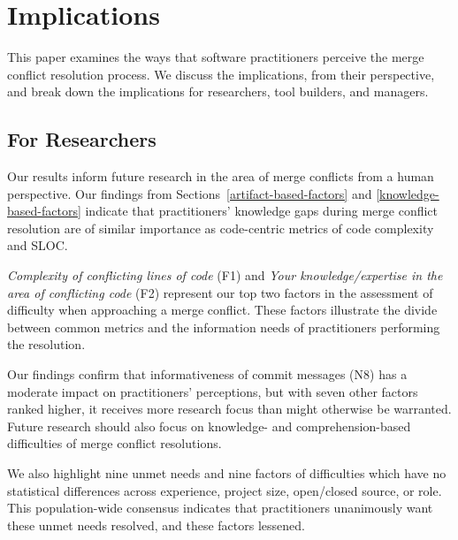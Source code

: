 \section{Implications}\label{implications}
This paper examines the ways that software practitioners perceive the merge conflict resolution process.
We discuss the implications, from their perspective, and break down the implications for researchers, tool builders, and managers.

\subsection{For Researchers}
Our results inform future research in the area of merge conflicts from a human perspective.
Our findings from Sections~\ref{artifact-based-factors} and \ref{knowledge-based-factors} indicate that practitioners' knowledge gaps during merge conflict resolution are of similar importance as code-centric metrics of code complexity and SLOC.

\textit{Complexity of conflicting lines of code} (F1) and \textit{Your knowledge/expertise in the area of conflicting code} (F2) represent our top two factors in the assessment of difficulty when approaching a merge conflict.
These factors illustrate the divide between common metrics and the information needs of practitioners performing the resolution.
 
Our findings confirm that informativeness of commit messages (N8) has a moderate impact on practitioners' perceptions, but with seven other factors ranked higher, it receives more research focus than might otherwise be warranted.
Future research should also focus on knowledge- and comprehension-based difficulties of  merge conflict resolutions.

We also highlight nine unmet needs and nine factors of difficulties which have no statistical differences across experience, project size, open/closed source, or role.
This population-wide consensus indicates that practitioners unanimously want these unmet needs resolved, and these factors lessened.

 


